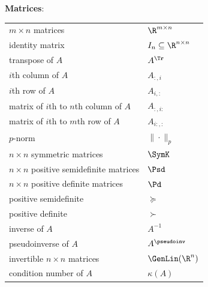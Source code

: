 \documentclass[11pt,twoside,a4paper,openright]{uclouvain-thesis}
\newenvironment{notationlist}[1]
{\vspace{1em}

\noindent
\textbf{#1}:


\begin{longtable}{p{0.5\textwidth}p{0.48\textwidth}}}
{\end{longtable}}
\begin{document}
\begin{notationlist}{Matrices}
  $m \times n$ matrices & $\R^{m \times n}$\\
  identity matrix & $I_n \subseteq \R^{n \times n}$\\
  transpose of $A$ & $A^\Tr$\\
  $i$th column of $A$ & $A_{:,i}$\\
  $i$th row of $A$ & $A_{i,:}$\\
  matrix of $i$th to $n$th column of $A$ & $A_{:,i:}$\\
  matrix of $i$th to $m$th row of $A$ & $A_{i:,:}$\\
  $p$-norm & $\|\cdot\|_p$\\
  $n \times n$ symmetric matrices & $\SymK$\\
  $n \times n$ positive semidefinite matrices & $\Psd$\\
  $n \times n$ positive definite matrices & $\Pd$\\
  positive semidefinite & $\succeq$\\
  positive definite & $\succ$\\
  inverse of $A$ & $A^{-1}$\\
  pseudoinverse of $A$ & $A^\pseudoinv$\\
  invertible $n \times n$ matrices & $\GenLin(\R^n)$\\
  condition number of $A$ & $\kappa(A)$\\
\end{notationlist}
\end{document}
